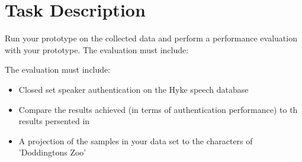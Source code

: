 \section{Task Description}
\label{task}

Run your prototype on the collected data and perform a performance evaluation with your prototype. The evaluation must include:

The evaluation must include:
\begin{itemize}
	\item[\textbullet] Closed set speaker authentication on the Hyke speech database
	\item[\textbullet] Compare the results achieved (in terms of authentication performance) to th results persented in 
	\item[\textbullet] A projection of the samples in your data set to the characters of 'Doddingtons Zoo' 
\end{itemize}